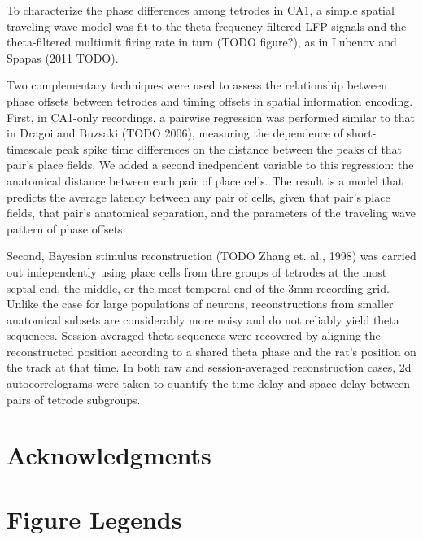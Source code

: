 \documentclass[10pt]{article}
\begin{document}
To characterize the phase differences among tetrodes in CA1, a simple spatial traveling wave model was fit to the theta-frequency filtered LFP signals and the theta-filtered multiunit firing rate in turn (TODO figure?), as in Lubenov and Spapas (2011 TODO).

Two complementary techniques were used to assess the relationship between phase offsets between tetrodes and timing offsets in spatial information encoding. First, in CA1-only recordings, a pairwise regression was performed similar to that in Dragoi and Buzsaki (TODO 2006), measuring the dependence of short-timescale peak spike time differences on the distance between the peaks of that pair's place fields. We added a second inedpendent variable to this regression: the anatomical distance between each pair of place cells. The result is a model that predicts the average latency between any pair of cells, given that pair's place fields, that pair's anatomical separation, and the parameters of the traveling wave pattern of phase offsets.

Second, Bayesian stimulus reconstruction (TODO Zhang et. al., 1998) was carried out independently using place cells from thre groups of tetrodes at the most septal end, the middle, or the most temporal end of the 3mm recording grid. Unlike the case for large populations of neurons, reconstructions from smaller anatomical subsets are considerably more noisy and do not reliably yield theta sequences. Session-averaged theta sequences were recovered by aligning the reconstructed position according to a shared theta phase and the rat's position on the track at that time. In both raw and session-averaged reconstruction cases, 2d autocorrelograms were taken to quantify the time-delay and space-delay between pairs of tetrode subgroups.


\section*{Acknowledgments}




\section*{Figure Legends}
\end{document}
